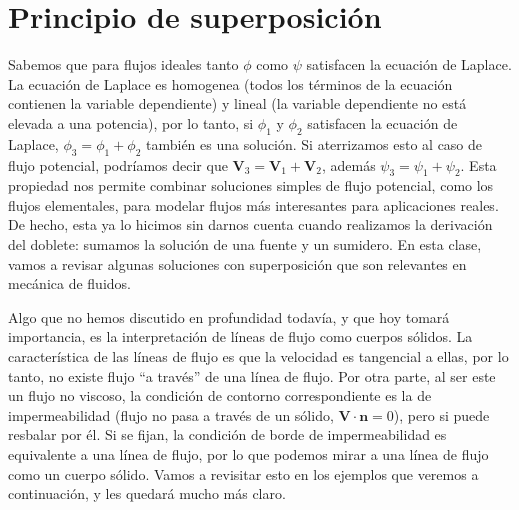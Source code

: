 \section*{Principio de superposición}
Sabemos que para flujos ideales tanto $\phi$ como $\psi$ satisfacen la ecuación de Laplace.
La ecuación de Laplace es homogenea (todos los términos de la ecuación contienen la variable dependiente) y lineal (la variable dependiente no está elevada a una potencia), por lo tanto, si $\phi_1$ y $\phi_2$ satisfacen la ecuación de Laplace, $\phi_3=\phi_1+\phi_2$ también es una solución.
Si aterrizamos esto al caso de flujo potencial, podríamos decir que $\mathbf{V}_3=\mathbf{V}_1+\mathbf{V}_2$, además $\psi_3=\psi_1+\psi_2$.
Esta propiedad nos permite combinar soluciones simples de flujo potencial, como los flujos elementales, para modelar flujos más interesantes para aplicaciones reales.
De hecho, esta ya lo hicimos sin darnos cuenta cuando realizamos la derivación del doblete: sumamos la solución de una fuente y un sumidero.
En esta clase, vamos a revisar algunas soluciones con superposición que son relevantes en mecánica de fluidos.

Algo que no hemos discutido en profundidad todavía, y que hoy tomará importancia, es la interpretación de líneas de flujo como cuerpos sólidos.
La característica de las líneas de flujo es que la velocidad es tangencial a ellas, por lo tanto, no existe flujo ``a través'' de una línea de flujo.
Por otra parte, al ser este un flujo no viscoso, la condición de contorno correspondiente es la de impermeabilidad (flujo no pasa a través de un sólido, $\mathbf{V}\cdot\mathbf{n}=0$), pero si puede resbalar por él.
Si se fijan, la condición de borde de impermeabilidad es equivalente a una línea de flujo, por lo que podemos mirar a una línea de flujo como un cuerpo sólido.
Vamos a revisitar esto en los ejemplos que veremos a continuación, y les quedará mucho más claro.
